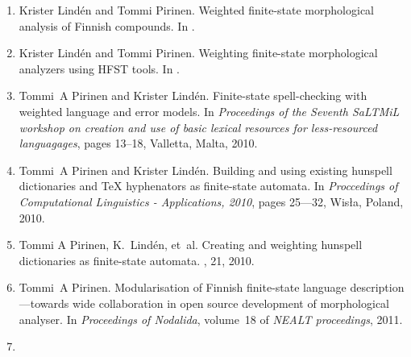 \documentclass[officiallayout]{unihelcompling}
\begin{document}

\begin{enumerate}
    \item[\citetalias{pirinen2009weighted}]
        Krister Lindén and Tommi Pirinen.
        \newblock Weighted finite-state morphological analysis of Finnish 
        compounds.
        \newblock In \citep{conf/nodalida/2009}.
    \item[\citetalias{pirinen2009weighting}]
        Krister Lindén and Tommi Pirinen.
        \newblock Weighting finite-state morphological analyzers using HFST
        tools.
        \newblock In \citep{conf/fsmnlp/2009}.
    \item[\citetalias{pirinen2010finitestate}]
        Tommi~A Pirinen and Krister Lindén.
        \newblock Finite-state spell-checking with weighted language and error
        models.
        \newblock In {\em Proceedings of the Seventh SaLTMiL workshop on 
            creation and use of basic lexical resources for less-resourced 
        languagages}, pages 13--18, Valletta, Malta, 2010.
    \item[\citetalias{pirinen2010building}]
        Tommi~A Pirinen and Krister Lindén.
        \newblock Building and using existing hunspell dictionaries and {\TeX }
        hyphenators as finite-state automata.
        \newblock In {\em Proccedings of Computational Linguistics -
            Applications, 2010}, pages 25---32, Wis{\l}a, Poland, 2010.
    \item[\citetalias{pirinen2010creating}]
        Tommi A Pirinen, K.~Lind{\'e}n, et~al.
        \newblock Creating and weighting hunspell dictionaries as finite-state
        automata.
        , 21, 2010.
    \item[\citetalias{pirinen2011modularisation}]
        Tommi~A Pirinen.
        \newblock Modularisation of Finnish finite-state language 
        description—towards wide collaboration in open source development of
        morphological analyser.
        \newblock In {\em Proceedings of Nodalida}, volume~18 of {\em NEALT
        proceedings}, 2011.
    \item[\citetalias{pirinen2012compiling}]

\end{enumerate}
\end{document}
